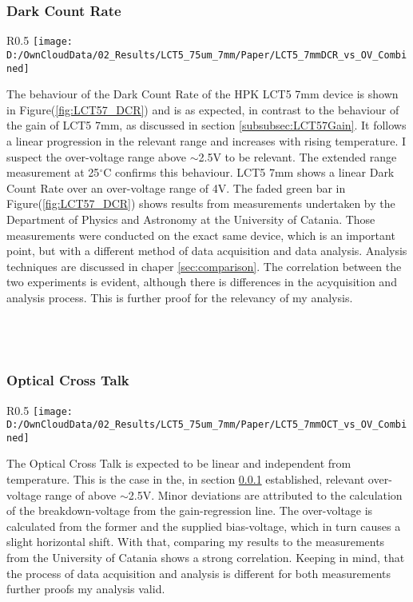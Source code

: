 \documentclass[12pt,article,type=msc,colorback,accentcolor=tud9c]{tudthesis}
\begin{document}
\subsubsection{Dark Count Rate}
\label{subsubsec:LCT57DCR}
\begin{wrapfigure}{R}{0.5\textwidth}
\centering
\texttt{[image: D:/OwnCloudData/02\_Results/LCT5\_75um\_7mm/Paper/LCT5\_7mmDCR\_vs\_OV\_Combined]}
\caption{\label{fig:LCT57_DCR}Dark Count Rate of the HPK LCT5 7mm pixel}
\end{wrapfigure}


The behaviour of the Dark Count Rate of the HPK LCT5 7mm device is shown in Figure(\ref{fig:LCT57_DCR}) and is as expected, in contrast to the behaviour of the gain of LCT5 7mm, as discussed in section {\ref{subsubsec:LCT57Gain}}. It follows a linear progression in the relevant range and increases with rising temperature. I suspect the over-voltage range above $\sim$2.5V to be relevant. The extended range measurement at 25$^\circ$C confirms this behaviour. LCT5 7mm shows a linear Dark Count Rate over an over-voltage range of 4V. The faded green bar in Figure(\ref{fig:LCT57_DCR}) shows results from measurements undertaken by the Department of Physics and Astronomy at the University of Catania. Those measurements were conducted on the exact same device, which is an important point, but with a different method of data acquisition and data analysis. Analysis techniques are discussed in chaper {\ref{sec:comparison}}. The correlation between the two experiments is evident, although there is differences in the acyquisition and analysis process. This is further proof for the relevancy of my analysis. 
\\\\\\\\


\subsubsection{Optical Cross Talk}
\begin{wrapfigure}{R}{0.5\textwidth}
\centering
\texttt{[image: D:/OwnCloudData/02\_Results/LCT5\_75um\_7mm/Paper/LCT5\_7mmOCT\_vs\_OV\_Combined]}
\caption{\label{fig:LCT57_OCT}Dark Count Rate of the HPK LCT5 7mm pixel}
\end{wrapfigure}

The Optical Cross Talk is expected to be linear and independent from temperature. This is the case in the, in section {\ref{subsubsec:LCT57DCR}} established, relevant over-voltage range of above $\sim$2.5V. Minor deviations are attributed to the calculation of the breakdown-voltage from the gain-regression line. The over-voltage is calculated from the former and the supplied bias-voltage, which in turn causes a slight horizontal shift. With that, comparing my results to the measurements from the University of Catania shows a strong correlation. Keeping in mind, that the process of data acquisition and analysis is different for both measurements further proofs my analysis valid. 
\end{document}
